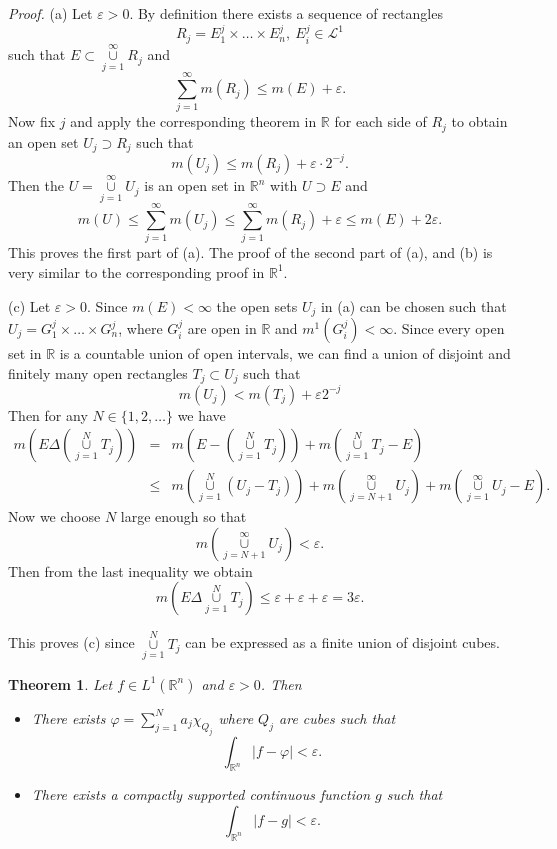 \documentclass[12pt]{report}
\newtheorem{theorem}{Theorem}[section]
\begin{document}
\vspace{.25cm}
\noindent
{\em Proof.}
(a)  Let $\varepsilon > 0$.  By definition there exists a sequence
of rectangles
\[
R_j = E^j_1 \times \dots \times E^j_n, \ E^j_i \in \mathcal{L}^1
\]
such that $E \subset \overset{\infty}{\underset{j=1}{\cup}} R_j$ and 
\[
\sum^\infty_{j=1} m(R_j) \le m(E) + \varepsilon.
\]
Now fix $j$ and apply the corresponding theorem in $\mathbb{R}$ for
each side of $R_j$ to obtain an open set $U_j \supset R_j$ such that
\[
m(U_j) \le m(R_j) + \varepsilon \cdot 2^{-j}.
\]
Then the $U = \overset{\infty}{\underset{j=1}{\cup}} U_j$ is an open set in
$\mathbb{R}^n$ with $U \supset E$ and 
\[
m(U) \le \sum^\infty_{j=1} m(U_j) \le \sum^\infty_{j=1} m(R_j) +
\varepsilon \le m(E) + 2\varepsilon.
\]
This proves the first part of (a).  The proof of the second part of (a), and
(b) is very similar to the corresponding proof in $\mathbb{R}^1$.

\medskip
\noindent
(c) Let $\varepsilon > 0$.  Since $m (E) < \infty$ the open  sets
$U_j$ in (a) can be chosen  such that $U_j = G^j_1 \times \dots \times
G^j_n$, where $G^j_i$ are open in $\mathbb{R}$ and $m^1(G^j_i) < \infty$. 
Since every open set in $\mathbb{R}$ is a countable  union of open
intervals, we can find a union of disjoint and finitely many open
rectangles $T_j  \subset U_j$ such that
\[
m(U_j) < m(T_j) + \varepsilon 2^{-j}
\]
Then for any $N \in \{1, 2, \dots\}$ we have
\begin{eqnarray*}
m\left ( E \Delta (\overset{N}{\underset{j=1}{\cup}} T_j)\right ) &=& m
\left (E-(\overset{N}{\underset{j=1}{\cup}} T_j)\right ) + m \left (
\overset{N}{\underset{j=1}{\cup}} T_j - E\right )\\
&\le& m \left ( \overset{N}{\underset{j=1}{\cup}} (U_j - T_j)\right ) + m
\left (
\overset{\infty}{\underset{j=N+1}{\cup}} U_j\right ) + m\left (
\overset{\infty}{\underset{j=1}{\cup}} U_j - E\right ).
\end{eqnarray*}
Now we choose $N$ large enough so that
\[
m\left ( \overset{\infty}{\underset{j=N+1}{\cup}} U_j\right ) <
\varepsilon.
\]
Then from the last inequality we obtain
\[
m\left ( E \Delta \overset{N}{\underset{j=1}{\cup}} T_j\right ) \le
\varepsilon +
\varepsilon + \varepsilon = 3\varepsilon.
\]

This proves (c) since $\overset{N}{\underset{j=1}{\cup}} T_j$ can be
expressed as a finite union of disjoint cubes.


\begin{theorem}  Let $f \in L^1(\mathbb{R}^n)$ and
$\varepsilon > 0$.  Then
\begin{itemize}
\item[(a)]  There exists $\varphi = \sum\limits^N_{j=1} a_j
\chi_{Q_j}$ where $Q_j$ are cubes such that 
\[
\int_{\mathbb{R}^n} |f - \varphi | < \varepsilon.
\]
\item[(b)]  There exists a compactly supported continuous
function
$g$ such that
\[
\int_{\mathbb{R}^n} |f-g| < \varepsilon.
\]
\end{itemize}
\end{theorem}
\end{document}
